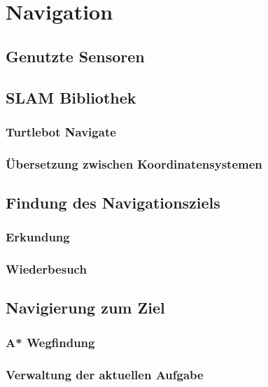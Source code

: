\section{Navigation}\label{sec:navigation}
\subsection{Genutzte Sensoren}
\subsection{SLAM Bibliothek}
\subsubsection{Turtlebot Navigate} %
\subsubsection{Übersetzung zwischen Koordinatensystemen}
\subsection{Findung des Navigationsziels}
\subsubsection{Erkundung}
\subsubsection{Wiederbesuch}
\subsection{Navigierung zum Ziel}
\subsubsection{A* Wegfindung}
\subsubsection{Verwaltung der aktuellen Aufgabe}
